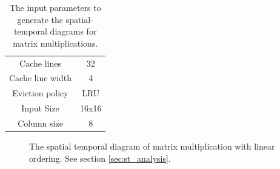 \begin{table}[H]
    \centering
    \begin{tabular}{|c c|}
        \hline
        Cache lines      & 32   \\
        Cache line width & 4    \\
        Eviction policy  & LRU  \\
        \hline
        Input Size       & 16x16\\
        Column size      & 8    \\
        \hline
    \end{tabular}
    \caption{
        The input parameters to generate the spatial-temporal diagrams for matrix multiplications.
    }
    \label{tab:sim_matrix_params}
\end{table}

\begin{figure}[H]
    \centering

    \caption{
        The spatial temporal diagram of matrix multiplication with linear ordering. 
        See section \ref{sec:st_analysis}.
    }
    \label{fig:st_matrix_naive}
\end{figure}

